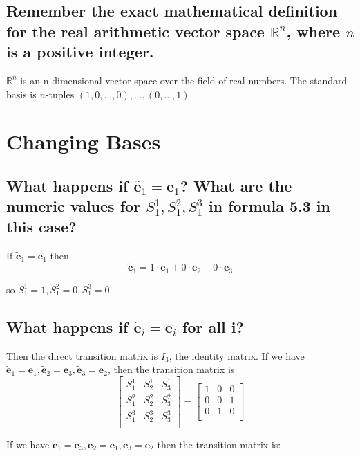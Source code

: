 \documentclass{article}
\newcommand{\basis}{\mathbf{e}_1}
\newcommand{\basiss}{\mathbf{e}_2}
\newcommand{\basisss}{\mathbf{e}_3}
\newcommand{\nbasis}{\widetilde{\mathbf{e}}_1}
\newcommand{\nbasiss}{\widetilde{\mathbf{e}}_2}
\newcommand{\nbasisss}{\widetilde{\mathbf{e}}_3}
\begin{document}
\subsection{Remember the exact mathematical definition for the real arithmetic vector space $\mathbb{R}^n$, where $n$ is a positive integer.}

$\mathbb{R}^n$ is an n-dimensional vector space over the field of real numbers. The standard basis is $n$-tuples $(1,0,\ldots,0), \ldots, (0, \ldots,1)$.

\section{Changing Bases}
\subsection{What happens if $\widetilde{\mathbf{e}_1}=\mathbf{e}_1$? What are the numeric values for $S_1^1,S_1^2,S_1^3$ in formula 5.3 in this case?}

If $\widetilde{\mathbf{e}}_1=\mathbf{e}_1$ then
$$\widetilde{\mathbf{e}}_1= 1 \cdot \mathbf{e}_1 + 0 \cdot \mathbf{e}_2 + 0 \cdot \mathbf{e}_3$$

so $S_1^1=1, S_1^2=0,S_1^3=0$.

\subsection{What happens if $\widetilde{\mathbf{e}}_i = \mathbf{e}_i$ for all i?}

Then the direct transition matrix is $I_3$, the identity matrix. If we have $\widetilde{\mathbf{e}}_1= \mathbf{e}_1, \widetilde{\mathbf{e}}_2=\mathbf{e}_3,\widetilde{\mathbf{e}}_3=\mathbf{e}_2$, then the transition matrix is
$$
\begin{bmatrix}
	S_1^1 & S_2^1 & S_3^1 \\
	S_1^2 & S_2^2 & S_3^2 \\
	S_1^3 & S_2^3 & S_3^3 \\
\end{bmatrix}
=
\begin{bmatrix}
	1 & 0 & 0 \\
	0 & 0 & 1 \\
	0 & 1 & 0 \\
\end{bmatrix}$$

If we have $\nbasis = \basisss, \nbasiss = \basis, \nbasisss = \basiss$ then the transition matrix is:
\end{document}
